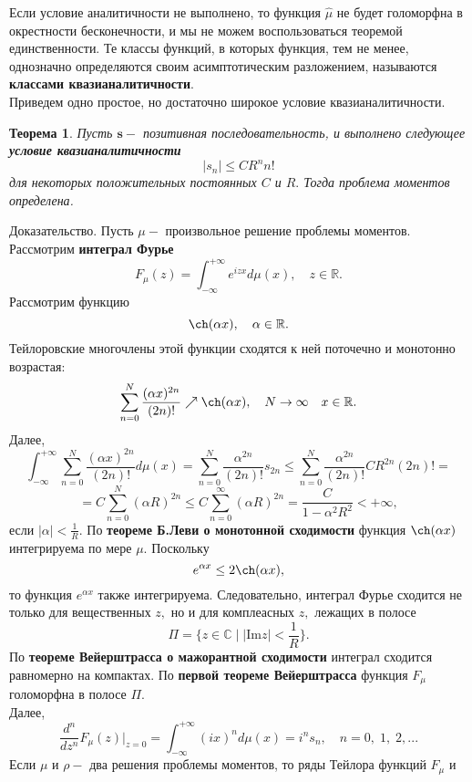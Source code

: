 \documentclass[12pt,a4paper]{article}
\theoremstyle{plain}   \newtheorem{Pro}{Задача}
\newtheorem{The}{Теорема}
\begin{document}
Если условие аналитичности не выполнено, то функция
$ \hat \mu $
не будет голоморфна в окрестности бесконечности, и мы не
можем воспользоваться теоремой единственности. Те классы
функций, в которых функция, тем не менее, однозначно
определяются своим асимптотическим разложением, называются
{\bfseries классами квазианалитичности}.
\\
Приведем одно простое, но достаточно широкое условие
квазианалитичности.
\begin{The}
Пусть
$ \mathbf{s} - $
позитивная последовательность, и выполнено следующее
{\bfseries условие квазианалитичности}
$$
  |s_n | \leq C R^n n!
$$
для некоторых положительных постоянных
$ C $
и
$ R . $
Тогда проблема моментов определена.
\end{The}
{\Large Доказательство.}
Пусть
$ \mu - $
произвольное решение проблемы моментов. Рассмотрим
{\bfseries интеграл Фурье}
$$
  F_{\mu}(z)=\int _{-\infty}^{+\infty}
  e^{izx}d\mu (x), \quad z \in \mathbb{R}.
$$
Рассмотрим функцию
$$
  \ch(\alpha x), \quad \alpha \in \mathbb{R}.
$$
Тейлоровские многочлены этой функции сходятся к ней
поточечно и монотонно возрастая:
$$
  \sum _{n=0}^N \frac{(\alpha x)^{2n}}{(2n)!}
  \nearrow \ch (\alpha x), \quad N \rightarrow \infty
  \quad x \in \mathbb{R} .
$$
Далее,
$$
  \int _{-\infty}^{+\infty} \sum _{n=0}^N
  \frac{(\alpha x)^{2n}}{(2n)!}d\mu (x)=
  \sum _{n=0}^N\frac{\alpha ^{2n}}{(2n)!}s_{2n} \leq
  \sum _{n=0}^N \frac{\alpha ^{2n}}{(2n)!}CR^{2n}(2n)!=
$$
$$
  =C \sum _{n=0}^N (\alpha R)^{2n} \leq
  C \sum _{n=0}^{\infty} (\alpha R)^{2n}=
  \frac{C}{1-\alpha ^2 R^2} <+\infty ,
$$
если
$ | \alpha |<\frac{1}{R} . $
По
{\bfseries теореме Б.Леви о монотонной сходимости}
функция
$ \ch (\alpha x) $
интегрируема по мере
$ \mu . $
Поскольку
$$
  e^{\alpha x} \leq 2 \ch (\alpha x),
$$
то функция
$ e^{\alpha x} $
также интегрируема. Следовательно, интеграл Фурье сходится
не только для вещественных
$ z , $
но и для комплеасных
$ z , $
лежащих в полосе
$$
  \Pi = \{ z \in \mathbb{C} \; | \; |\mathrm{Im} z |<\frac{1}{R} \} .
$$
По
{\bfseries теореме Вейерштрасса о мажорантной сходимости}
интеграл сходится равномерно на компактах.
По
{\bfseries первой теореме Вейерштрасса}
функция
$ F_{\mu} $
голоморфна в полосе
$ \Pi . $
\\
Далее,
$$
  \frac{d^n}{dz^n}F_{\mu}(z)|_{z=0}=
  \int _{-\infty}^{+\infty}(ix)^n d\mu (x)=
  i^n s_n , \quad n=0, \; 1, \; 2,...
$$
Если
$ \mu $
и
$ \rho - $
два решения проблемы моментов, то ряды Тейлора функций
$ F_{\mu } $
и
\end{document}
